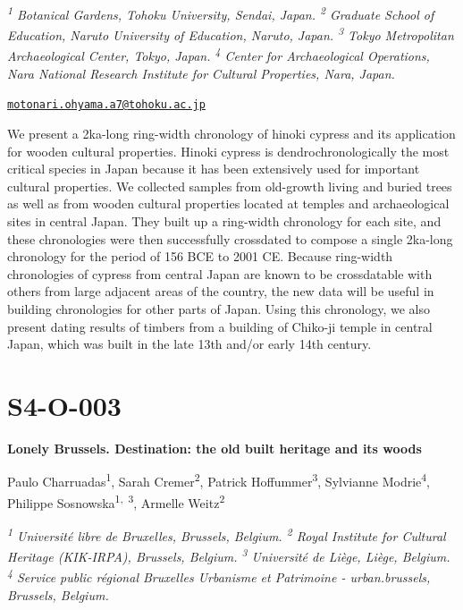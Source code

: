 \documentclass[
]{book}
\begin{document}
\emph{\textsuperscript{1} Botanical Gardens, Tohoku University, Sendai, Japan. \textsuperscript{2} Graduate School of Education, Naruto University of Education, Naruto, Japan. \textsuperscript{3} Tokyo Metropolitan Archaeological Center, Tokyo, Japan. \textsuperscript{4} Center for Archaeological Operations, Nara National Research Institute for Cultural Properties, Nara, Japan.}

\href{mailto:motonari.ohyama.a7@tohoku.ac.jp}{\nolinkurl{motonari.ohyama.a7@tohoku.ac.jp}}

We present a 2ka-long ring-width chronology of hinoki cypress and its application for wooden cultural properties. Hinoki cypress is dendrochronologically the most critical species in Japan because it has been extensively used for important cultural properties. We collected samples from old-growth living and buried trees as well as from wooden cultural properties located at temples and archaeological sites in central Japan. They built up a ring-width chronology for each site, and these chronologies were then successfully crossdated to compose a single 2ka-long chronology for the period of 156 BCE to 2001 CE. Because ring-width chronologies of cypress from central Japan are known to be crossdatable with others from large adjacent areas of the country, the new data will be useful in building chronologies for other parts of Japan. Using this chronology, we also present dating results of timbers from a building of Chiko-ji temple in central Japan, which was built in the late 13th and/or early 14th century.

\hypertarget{s4-o-003}{%
\section*{S4-O-003}\label{s4-o-003}}

\textbf{Lonely Brussels. Destination: the old built heritage and its woods}

Paulo Charruadas\textsuperscript{1}, Sarah Cremer\textsuperscript{2}, Patrick Hoffummer\textsuperscript{3}, Sylvianne Modrie\textsuperscript{4}, Philippe Sosnowska\textsuperscript{1,~3}, Armelle Weitz\textsuperscript{2}

\emph{\textsuperscript{1} Université libre de Bruxelles, Brussels, Belgium. \textsuperscript{2} Royal Institute for Cultural Heritage (KIK-IRPA), Brussels, Belgium. \textsuperscript{3} Université de Liège, Liège, Belgium. \textsuperscript{4} Service public régional Bruxelles Urbanisme et Patrimoine - urban.brussels, Brussels, Belgium.}
\end{document}
